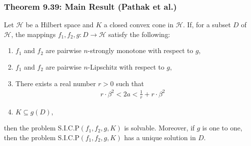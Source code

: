 \documentclass[aspectratio=169,10pt]{beamer}
\begin{document}
\begin{frame}
\frametitle{Theorem 9.39: Main Result (Pathak et al.)}

\begin{theorem}
Let $\mathcal{H}$ be a Hilbert space and $K$ a closed convex cone in $\mathcal{H}$.
If, for a subset $D$ of $\mathcal{H}$, the mappings $f_1, f_2, g : D \to \mathcal{H}$ satisfy
the following:
\begin{enumerate}
    \item[(1)] $f_1$ and $f_2$ are pairwise $n$-strongly monotone with respect to $g$,
    \item[(2)] $f_1$ and $f_2$ are pairwise $n$-Lipschitz with respect to $g$,
    \item[(3)] There exists a real number $r > 0$ such that
    \begin{align*}
    r \cdot \beta^2 < 2a < \frac{1}{r} + r \cdot \beta^2
    \end{align*}
    \item[(4)] $K \subseteq g(D)$,
\end{enumerate}
then the problem S.I.C.P$(f_1, f_2, g, K)$ is solvable. Moreover, if $g$ is one to one,
then the problem S.I.C.P$(f_1, f_2, g, K)$ has a unique solution in $D$.
\end{theorem}

\end{frame}
\end{document}
